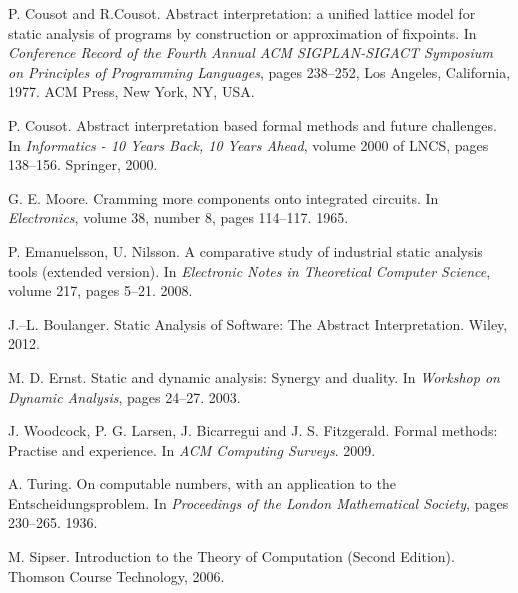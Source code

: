 \documentclass[12pt,final,oneside]{fithesis2}
\theoremstyle{definition}
\begin{document}
\renewcommand*{\bibname}{\chapter{Bibliography}\vspace{-1em}}
\begin{thebibliography}{99}

P{.} Cousot and R{.}Cousot.
\newblock Abstract interpretation: a unified lattice model for static
  analysis of programs by construction or approximation of fixpoints.
\newblock In \emph{Conference Record of the Fourth Annual ACM
  SIGPLAN-SIGACT Symposium on Principles of Programming Languages},
  pages 238--252, Los Angeles, California, 1977. ACM Press, New York,
  NY, USA.

P{.} Cousot.
\newblock Abstract interpretation based formal methods and future
  challenges.
\newblock In \emph{Informatics - 10 Years Back, 10 Years Ahead},
  volume 2000 of LNCS, pages 138--156. Springer, 2000.

G{.} E{.} Moore.
\newblock Cramming more components onto integrated circuits.
\newblock In \emph{Electronics}, volume 38, number 8, pages 114--117. 1965.

P{.} Emanuelsson, U{.} Nilsson.
\newblock A comparative study of industrial static analysis tools (extended
  version).
\newblock In \emph{Electronic Notes in Theoretical Computer Science},
  volume 217, pages 5--21. 2008.

J{.}--L{.} Boulanger.
\newblock Static Analysis of Software: The Abstract Interpretation.
\newblock Wiley, 2012.

M{.} D{.} Ernst.
\newblock Static and dynamic analysis: Synergy and duality.
\newblock In \emph{Workshop on Dynamic Analysis}, pages 24--27. 2003.

J{.} Woodcock, P{.} G{.} Larsen, J{.} Bicarregui and J{.} S{.} Fitzgerald.
\newblock Formal methods: Practise and experience.
\newblock In \emph{ACM Computing Surveys}. 2009.

A{.} Turing.
\newblock On computable numbers, with an application to the
  Entscheidungsproblem.
\newblock In \emph{Proceedings of the London Mathematical Society},
  pages 230--265. 1936.

M{.} Sipser.
\newblock Introduction to the Theory of Computation (Second Edition).
\newblock Thomson Course Technology, 2006.


\end{thebibliography}
\end{document}
